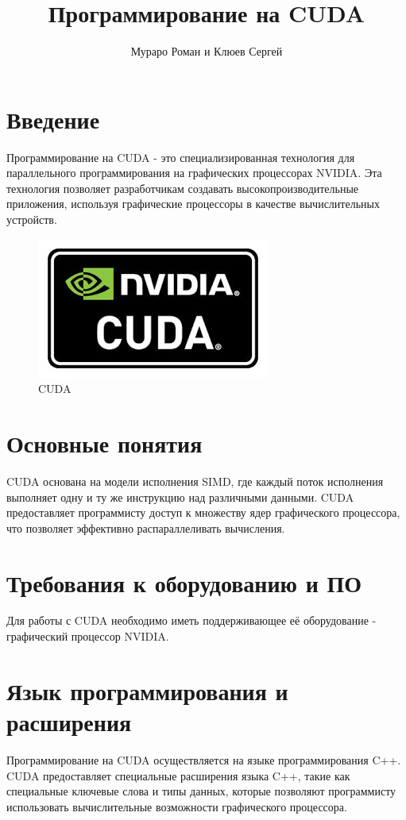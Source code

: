 \documentclass[a4paper, 12pt]{article}
\title{Программирование на CUDA}
\author{Мураро Роман и Клюев Сергей}
\date{}
\begin{document}
\maketitle

\section{Введение}
Программирование на CUDA - это специализированная технология для параллельного программирования на графических процессорах NVIDIA. Эта технология позволяет разработчикам создавать высокопроизводительные приложения, используя графические процессоры в качестве вычислительных устройств.


\begin{figure}[!ht] 
		\centering
		\includegraphics[scale=0.5]{kekw.png} 
		\caption{CUDA}
		\label{fig:first_image}
	\end{figure}

\section{Основные понятия}
CUDA основана на модели исполнения SIMD, где каждый поток исполнения выполняет одну и ту же инструкцию над различными данными. CUDA предоставляет программисту доступ к множеству ядер графического процессора, что позволяет эффективно распараллеливать вычисления.

\section{Требования к оборудованию и ПО}
Для работы с CUDA необходимо иметь поддерживающее её оборудование - графический процессор NVIDIA.

\section{Язык программирования и расширения}
Программирование на CUDA осуществляется на языке программирования C++. CUDA предоставляет специальные расширения языка C++, такие как специальные ключевые слова и типы данных, которые позволяют программисту использовать вычислительные возможности графического процессора.
\end{document}
